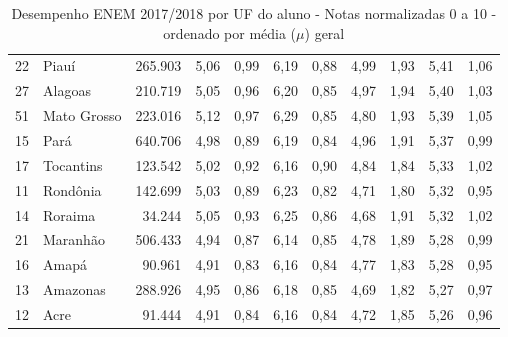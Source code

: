 \begin{table}[]
{\begin{tabular}{llrrrrrrrrr}
            22 & Piauí               & 265.903   & 5,06 & 0,99 & 6,19 & 0,88 & 4,99 & 1,93 & 5,41 & 1,06 \\
            \rowcolor[HTML]{DCE6F1}
            27 & Alagoas             & 210.719   & 5,05 & 0,96 & 6,20 & 0,85 & 4,97 & 1,94 & 5,40 & 1,03 \\
            51 & Mato Grosso         & 223.016   & 5,12 & 0,97 & 6,29 & 0,85 & 4,80 & 1,93 & 5,39 & 1,05 \\
            \rowcolor[HTML]{DCE6F1}
            15 & Pará                & 640.706   & 4,98 & 0,89 & 6,19 & 0,84 & 4,96 & 1,91 & 5,37 & 0,99 \\
            17 & Tocantins           & 123.542   & 5,02 & 0,92 & 6,16 & 0,90 & 4,84 & 1,84 & 5,33 & 1,02 \\
            \rowcolor[HTML]{DCE6F1}
            11 & Rondônia            & 142.699   & 5,03 & 0,89 & 6,23 & 0,82 & 4,71 & 1,80 & 5,32 & 0,95 \\
            14 & Roraima             & 34.244    & 5,05 & 0,93 & 6,25 & 0,86 & 4,68 & 1,91 & 5,32 & 1,02 \\
            \rowcolor[HTML]{DCE6F1}
            21 & Maranhão            & 506.433   & 4,94 & 0,87 & 6,14 & 0,85 & 4,78 & 1,89 & 5,28 & 0,99 \\
            16 & Amapá               & 90.961    & 4,91 & 0,83 & 6,16 & 0,84 & 4,77 & 1,83 & 5,28 & 0,95 \\
            \rowcolor[HTML]{DCE6F1}
            13 & Amazonas            & 288.926   & 4,95 & 0,86 & 6,18 & 0,85 & 4,69 & 1,82 & 5,27 & 0,97 \\
            12 & Acre                & 91.444    & 4,91 & 0,84 & 6,16 & 0,84 & 4,72 & 1,85 & 5,26 & 0,96
        \end{tabular}
    }
    \caption{ Desempenho ENEM 2017/2018 por UF do aluno - Notas normalizadas 0 a 10 - ordenado por média ($\mu$) geral}
    \label{table:ENEM}
\end{table}

